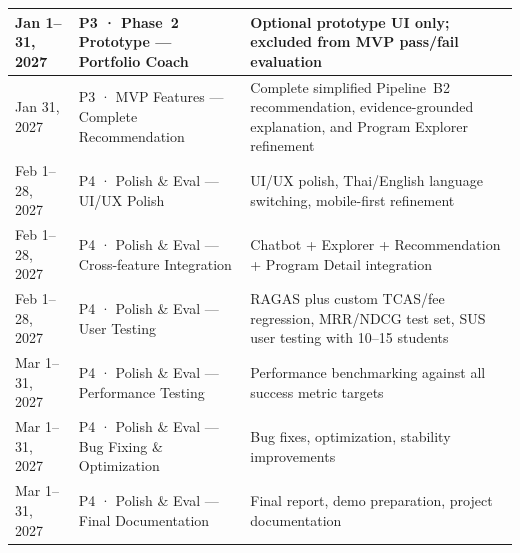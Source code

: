 \begin{table}[htbp]
\begin{tabularx}{\textwidth}{|L{3cm}|L{3.2cm}|Y|}
\hline
Jan 1--31, 2027 & P3 · Phase~2 Prototype — Portfolio Coach & Optional prototype UI only; excluded from MVP pass/fail evaluation \\
\hline
Jan 31, 2027 & P3 · MVP Features — Complete Recommendation & Complete simplified Pipeline~B2 recommendation, evidence-grounded explanation, and Program Explorer refinement \\
\hline
Feb 1--28, 2027 & P4 · Polish \& Eval — UI/UX Polish & UI/UX polish, Thai/English language switching, mobile-first refinement \\
\hline
Feb 1--28, 2027 & P4 · Polish \& Eval — Cross-feature Integration & Chatbot + Explorer + Recommendation + Program Detail integration \\
\hline
Feb 1--28, 2027 & P4 · Polish \& Eval — User Testing & RAGAS plus custom TCAS/fee regression, MRR/NDCG test set, SUS user testing with 10--15 students \\
\hline
Mar 1--31, 2027 & P4 · Polish \& Eval — Performance Testing & Performance benchmarking against all success metric targets \\
\hline
Mar 1--31, 2027 & P4 · Polish \& Eval — Bug Fixing \& Optimization & Bug fixes, optimization, stability improvements \\
\hline
Mar 1--31, 2027 & P4 · Polish \& Eval — Final Documentation & Final report, demo preparation, project documentation \\
\hline
\end{tabularx}
\end{table}

